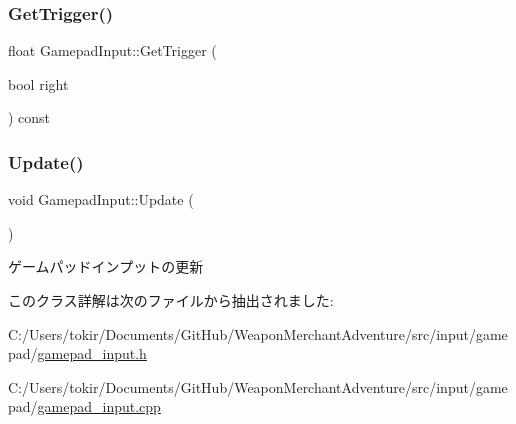 \mbox{\label{class_gamepad_input_ac3910a477532b943f2235571dda111ae}} 
\subsubsection{\texorpdfstring{Get\+Trigger()}{GetTrigger()}}
{\footnotesize\ttfamily float Gamepad\+Input\+::\+Get\+Trigger (\begin{DoxyParamCaption}\item[{bool}]{right }\end{DoxyParamCaption}) const\hspace{0.3cm}{\ttfamily [inline]}}

\mbox{\label{class_gamepad_input_a3512c0cc4d57534c83db09c4b5377caa}} 
\subsubsection{\texorpdfstring{Update()}{Update()}}
{\footnotesize\ttfamily void Gamepad\+Input\+::\+Update (\begin{DoxyParamCaption}{ }\end{DoxyParamCaption})}



ゲームパッドインプットの更新 



このクラス詳解は次のファイルから抽出されました\+:\begin{DoxyCompactItemize}
\item 
C\+:/\+Users/tokir/\+Documents/\+Git\+Hub/\+Weapon\+Merchant\+Adventure/src/input/gamepad/\mbox{\hyperlink{gamepad__input_8h}{gamepad\+\_\+input.\+h}}\item 
C\+:/\+Users/tokir/\+Documents/\+Git\+Hub/\+Weapon\+Merchant\+Adventure/src/input/gamepad/\mbox{\hyperlink{gamepad__input_8cpp}{gamepad\+\_\+input.\+cpp}}\end{DoxyCompactItemize}
